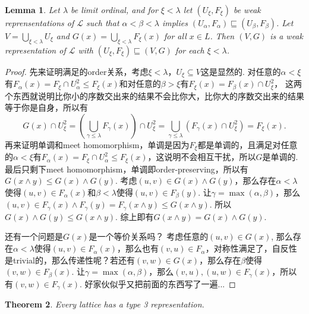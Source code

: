 \documentclass{article}
\newtheorem{theorem}{Theorem}[section]
\newtheorem{lemma}[theorem]{Lemma}
\newcommand\lattice{\mathcal{L}}
\begin{document}
\begin{lemma}
\rm Let $\lambda$ be limit ordinal, and for $\xi < \lambda$ let $(U_\xi, F_\xi)$ be weak reprensentations of $\lattice$ such that $\alpha < \beta < \lambda$ implies $(U_\alpha,F_\alpha) \sqsubseteq (U_\beta, F_\beta)$. Let $V = \bigcup\limits_{\xi < \lambda} U_\xi$ and $G(x) = \bigcup\limits_{\xi < \lambda}F_\xi(x)$ for all $x \in L$. Then $(V,G)$ is a weak representation of $\lattice$ with $(U_\xi, F_\xi) \sqsubseteq (V,G)$ for each $\xi < \lambda$.
\end{lemma}

\begin{proof}
先来证明满足的order关系，考虑$\xi < \lambda$，$U_\xi \subseteq V$这是显然的.    对任意的$\alpha < \xi$有$F_\alpha(x) = F_\xi \cap U_\alpha^2 \leq F_\xi(x)$和对任意的$\beta > \xi$有$F_\xi(x) = F_\beta(x) \cap U_\xi^2$，{\color{blue} 这两个东西就说明比你小的序数交出来的结果不会比你大，比你大的序数交出来的结果等于你是自身}，所以有
$$
G(x) \cap U_\xi^2 = \left( \bigcup\limits_{\gamma \leq \lambda} F_\gamma(x) \right) \cap U_\xi^2 = \bigcup\limits_{\gamma \leq \lambda}(F_\gamma(x) \cap U_\xi^2) = F_\xi(x).
$$
再来证明单调和meet homomorphism，单调是因为$F_\xi$都是单调的，且满足对任意的$\alpha < \xi$有$F_\alpha(x) = F_\xi \cap U_\alpha^2 \leq F_\xi(x)$，这说明不会相互干扰，所以$G$是单调的. 最后只剩下meet homomorphism，单调即order-preserving，所以有$G(x \wedge y) \leq G(x) \wedge G(y)$. 考虑$(u,v) \in G(x) \wedge G(y)$，那么存在$\alpha < \lambda$使得$(u,v) \in F_\alpha(x)$和$\beta < \lambda$使得$(u,v) \in F_\beta(y)$. 让$\gamma = \max(\alpha,\beta)$，那么$(u,v) \in F_\gamma(x) \wedge F_\gamma(y) = F_\gamma(x \wedge y) \leq G(x \wedge y)$. 所以$G(x) \wedge G(y) \leq G(x \wedge y).$ 综上即有$G(x \wedge y) = G(x) \wedge G(y)$. 

还有一个问题是$G(x)$是一个等价关系吗？ 考虑任意的$(u,v) \in G(x)$, 那么存在$\alpha < \lambda$使得$(u,v) \in F_\alpha(x)$，那么也有$(v,u) \in F_\alpha$，对称性满足了，自反性是trivial的，那么传递性呢？若还有$(v,w) \in G(x)$，那么存在$\beta$使得$(v,w) \in F_\beta(x)$. 让$\gamma= \max(\alpha,\beta)$，那么$(v,u),(u,w) \in F_\gamma(x)$，所以有$(v,w) \in F_\gamma(x)$. 好家伙似乎又把前面的东西写了一遍...
\end{proof}

\begin{theorem}
\rm Every lattice has a type 3 representation.
\end{theorem}
\end{document}
